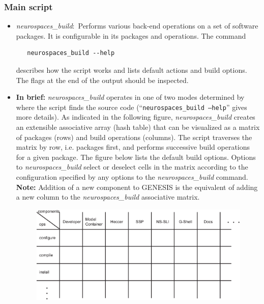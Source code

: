 \documentclass[12pt]{article}
\begin{document}
\subsubsection*{Main script}

\begin{itemize}
   \item {\it neurospaces\_build}:\,\,\,Performs various back-end operations on a set of software packages. It is configurable in its packages and operations. The command
      \begin{verbatim}
   neurospaces_build --help
      \end{verbatim}
describes how the script works and lists default actions and build options. The flags at the end of the output should be inspected.

   \item {\bf In brief:} {\it neurospaces\_build} operates in one of two modes determined by where the script finds the source code (``{\tt neurospaces\_build --help}'' gives more details). As indicated in the following figure, {\it neurospaces\_build} creates an extensible associative array (hash table) that can be visualized as a matrix of packages (rows) and build operations (columns). The script traverses the matrix by row, i.e. packages first, and performs successive build operations for a given package. The figure below  lists the default build options. Options to {\it neurospaces\_build} select or deselect cells in the matrix according to the configuration specified by any options to the {\it neurospaces\_build} command. {\bf Note:} Addition of a new component to GENESIS is the equivalent of adding a new column to the {\it neurospaces\_build} associative matrix.
   
\begin{figure}[h]
   \centering
   \includegraphics[scale=0.7]{figures/build-matrix.eps}
\end{figure}
   

\end{itemize}
\end{document}
